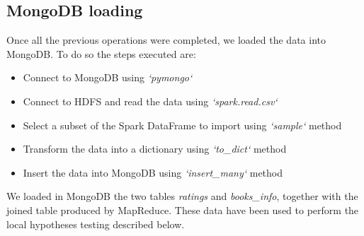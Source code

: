 \subsection*{MongoDB loading}
Once all the previous operations were completed, we loaded the data into MongoDB. To do so the steps 
executed are:

\begin{itemize}[leftmargin=*, noitemsep]
\item Connect to MongoDB using \textit{`pymongo`}
\item Connect to HDFS and read the data using \textit{`spark.read.csv`}
\item Select a subset of the Spark DataFrame to import using \textit{`sample`} method
\item Transform the data into a dictionary using \textit{`to\_dict`} method
\item Insert the data into MongoDB using \textit{`insert\_many`} method
\end{itemize}

\noindent
We loaded in MongoDB the two tables \textit{ratings} and \textit{books\_info}, together with the joined table produced
by MapReduce. These data have been used to perform the local hypotheses testing described below.